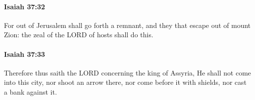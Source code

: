 		\paragraph{Isaiah 37:32} %
			\label{ISAIAH-37-32}

			For out of Jerusalem shall go forth a remnant, and they that escape out of mount Zion: the zeal of the LORD of hosts shall do this.


		\paragraph{Isaiah 37:33} %
			\label{ISAIAH-37-33}

			Therefore thus saith the LORD concerning the king of Assyria, He shall not come into this city, nor shoot an arrow there, nor come before it with shields, nor cast a bank against it.


